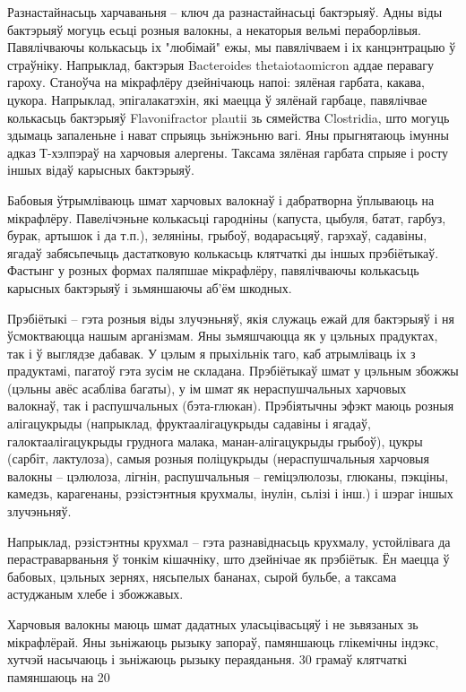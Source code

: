 Разнастайнасьць харчаваньня – ключ да разнастайнасьці бактэрыяў. Адны віды бактэрыяў могуць есьці розныя валокны, а некаторыя вельмі пераборлівыя. Павялічваючы колькасьць іх "любімай" ежы, мы павялічваем і іх канцэнтрацыю ў страўніку. Напрыклад, бактэрыя Bacteroides thetaiotaomicron аддае перавагу гароху. Станоўча на мікрафлёру дзейнічаюць напоі: зялёная гарбата, какава, цукора. Напрыклад, эпігалакатэхін, які маецца ў зялёнай гарбаце, павялічвае колькасьць бактэрыяў Flavonifractor plautii зь сямейства Clostridia, што могуць здымаць запаленьне і нават спрыяць зьніжэньню вагі. Яны прыгнятаюць імунны адказ Т-хэлпэраў на харчовыя алергены. Таксама зялёная гарбата спрыяе і росту іншых відаў карысных бактэрыяў.

Бабовыя ўтрымліваюць шмат харчовых валокнаў і дабратворна ўплываюць на мікрафлёру. Павелічэньне колькасьці гародніны (капуста, цыбуля, батат, гарбуз, бурак, артышок і да т.п.), зеляніны, грыбоў, водарасьцяў, гарэхаў, садавіны, ягадаў забясьпечыць дастатковую колькасьць клятчаткі ды іншых прэбіётыкаў. Фастынг у розных формах паляпшае мікрафлёру, павялічваючы колькасьць карысных бактэрыяў і зьмяншаючы аб'ём шкодных.

Прэбіётыкі – гэта розныя віды злучэньняў, якія служаць ежай для бактэрыяў і ня ўсмоктваюцца нашым арганізмам. Яны зьмяшчаюцца як у цэльных прадуктах, так і ў выглядзе дабавак. У цэлым я прыхільнік таго, каб атрымліваць іх з прадуктамі, пагатоў гэта зусім не складана. Прэбіётыкаў шмат у цэльным збожжы (цэльны авёс асабліва багаты), у ім шмат як нераспушчальных харчовых валокнаў, так і распушчальных (бэта-глюкан). Прэбіятычны эфэкт маюць розныя алігацукрыды (напрыклад, фруктаалігацукрыды садавіны і ягадаў, галоктаалігацукрыды груднога малака, манан-алігацукрыды грыбоў), цукры (сарбіт, лактулоза), самыя розныя поліцукрыды (нераспушчальныя харчовыя валокны – цэлюлоза, лігнін, распушчальныя – геміцэлюлозы, глюканы, пэкціны, камедзь, карагенаны, рэзістэнтныя крухмалы, інулін, сьлізі і інш.) і шэраг іншых злучэньняў.

Напрыклад, рэзістэнтны крухмал – гэта разнавіднасьць крухмалу, устойлівага да перастраварваньня ў тонкім кішачніку, што дзейнічае як прэбіётык. Ён маецца ў бабовых, цэльных зернях, нясьпелых бананах, сырой бульбе, а таксама астуджаным хлебе і збожжавых.

Харчовыя валокны маюць шмат дадатных уласьцівасьцяў і не зьвязаных зь мікрафлёрай. Яны зьніжаюць рызыку запораў, памяншаюць глікемічны індэкс, хутчэй насычаюць і зьніжаюць рызыку пераяданьня. 30 грамаў клятчаткі памяншаюць на 20%


